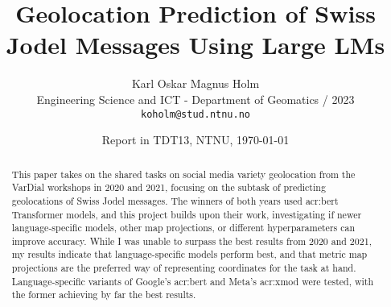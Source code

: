 \documentclass[11pt]{article}
\title{Geolocation Prediction of Swiss Jodel Messages Using Large LMs}
\author{Karl Oskar Magnus Holm \\
  Engineering Science and ICT - Department of Geomatics / 2023 \\
  {\tt koholm@stud.ntnu.no} \\}
\date{Report in TDT13, NTNU, \today}
\begin{document}
\maketitle


\begin{abstract}
    \begin{comment}
    This paper provides a template for writing a Project Report in TDT13, Advanced Text Analytics and Language Understanding.
    The document itself conforms to its own specifications and is thus an example of what your manuscript should look like.
    The template does not form a compulsory style that you are obliged to use, but rather provides a common starting point for all students.
    For a given report, tuning of the template may still be required, depending on the nature of the report and the author's writing style.
    Such tuning might involve moving a section to a subsection or vice versa, or removing or adding sections and subsections.

    Note that the template contains a lot of examples of how to write different parts of the report
    as well as how to cite authors and how to use LaTeX and BibTeX.
    Some of those examples might only be clear if you actually look at the LaTeX source itself.

    The abstract is your sales pitch which encourages people to read your work,
    but unlike sales it should be realistic with respect to the contributions of the work.
    It should include:
    \begin{itemize}
        \item what the research topic is,
        \item the research approach(es) applied, and
        \item contributions.
    \end{itemize}

    The abstract should not exceed 200 words.
    Do not include lists, tables or figures.
    Avoid abbreviations and references.
    \end{comment}

    This paper takes on the shared tasks on social media variety geolocation from the VarDial workshops in 2020 and 2021, focusing on the subtask of predicting geolocations of Swiss Jodel messages. The winners of both years used \acrshort{acr:bert} Transformer models, and this project builds upon their work, investigating if newer language-specific models, other map projections, or different hyperparameters can improve accuracy. While I was unable to surpass the best results from 2020 and 2021, my results indicate that language-specific models perform best, and that metric map projections are the preferred way of representing coordinates for the task at hand. Language-specific variants of Google's \acrshort{acr:bert} and Meta's \acrshort{acr:xmod} were tested, with the former achieving by far the best results.
\end{abstract}
\end{document}
